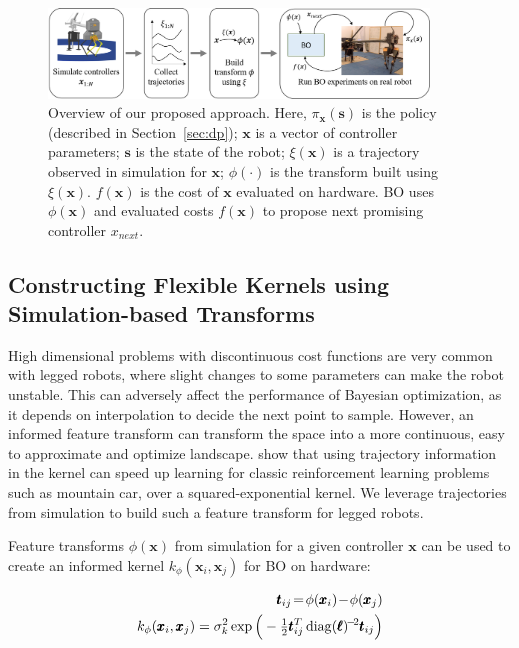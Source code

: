 \begin{figure}
    \centering
    \includegraphics[width=0.9\textwidth]{img/approach.png}
    \caption{Overview of our proposed approach. Here, $\pi_{\pmb{x}}(\pmb{s})$ is the policy (described in Section~\ref{sec:dp});  $\pmb{x}$ is a vector of controller parameters; $\pmb{s}$ is the state of the robot; $\xi(\pmb{x})$ is a trajectory observed in simulation for $\pmb{x}$; $\phi(\cdot)$ is the transform built using $\xi(\pmb{x})$. $f(\pmb{x})$ is the cost of $\pmb{x}$ evaluated on hardware. BO uses $\phi(\pmb{x})$ and evaluated costs $f(\pmb{x})$ to propose next promising controller $x_{next}$. }
    \label{fig:approach}
\end{figure}

\subsection{Constructing Flexible Kernels using Simulation-based Transforms}

High dimensional problems with discontinuous cost functions are very common with legged robots, where slight changes to some parameters can make the robot unstable. This can adversely affect the performance of Bayesian optimization, as it depends on interpolation to decide the next point to sample. However, an informed feature transform can transform the space into a more continuous, easy to approximate and optimize landscape. \cite{wilson2014using} show that using trajectory information in the kernel can speed up learning for classic reinforcement learning problems such as mountain car, over a squared-exponential kernel. We leverage trajectories from simulation to build such a feature transform for legged robots.

Feature transforms $\phi(\pmb{x})$ from simulation for a given controller $\pmb{x}$ can be used to create an informed kernel $k_{\phi}(\pmb{x}_i, \pmb{x}_j)$ for BO on hardware:

\begin{align}
    \pmb{t}_{ij} \!=\! \phi(\pmb{x}_i) \!-\! \phi(\pmb{x}_j) \\
    k_{\phi}(\pmb{x}_i, \pmb{x}_j) = \sigma_k^2 \exp\Big(- \tfrac{1}{2} \pmb{t}_{ij}^T  \operatorname*{diag}(\pmb{\ell})^{\!-\!2} \pmb{t}_{ij} \Big)
\end{align}



